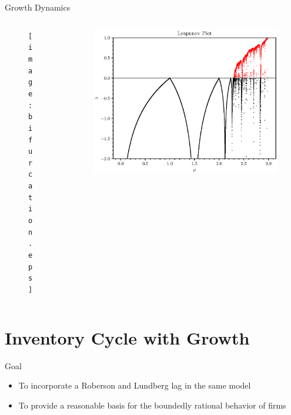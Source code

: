 \documentclass{beamer}
\begin{document}
\begin{frame}{Growth Dynamics}
	\begin{columns}
	\begin{column}{0.5\textwidth}
		\begin{figure}
			\centering
			\texttt{[image: bifurcation.eps]}
		\end{figure}
	\end{column}
	\begin{column}{0.5\textwidth}
		\begin{figure}
			\centering
			\includegraphics[width=1.2\textwidth]{lyapunov.eps}
		\end{figure}
	\end{column}
	\end{columns}
\end{frame}

\section*{Inventory Cycle with Growth}
\begin{frame}{Goal}
	\begin{itemize}
		\item To incorporate a Roberson and Lundberg lag in the same model
		\item To provide a reasonable basis for the boundedly rational behavior of firms
	\end{itemize}
\end{frame}
\end{document}
